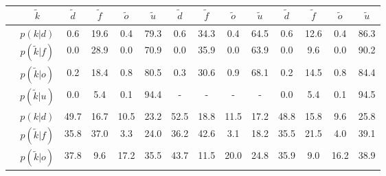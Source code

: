 \newpage
\begin{center}
	\footnotesize
	\begin{tabular}{c|c|cccc|cccc|cccc}
		&$\tilde{k}$ & $\tilde{d}$ & $\tilde{f}$ & $\tilde{o}$ & $\tilde{u}$ & $\tilde{d}$ & $\tilde{f}$ & $\tilde{o}$ & $\tilde{u}$ & $\tilde{d}$ & $\tilde{f}$ & $\tilde{o}$ & $\tilde{u}$\\
		\hline
		\parbox[t]{2mm}{}&$p(k|d)$ & \textcolor{mygreen}{0.6} & \textcolor{myred}{19.6} & \textcolor{myred}{0.4} & 79.3 & \textcolor{mygreen}{0.6} & \textcolor{myred}{34.3} & \textcolor{myred}{0.4} & 64.5 & \textcolor{mygreen}{0.6} & \textcolor{myred}{12.6} & \textcolor{myred}{0.4} & 86.3\\
		&$p(\tilde{k}|f)$ & \textcolor{myred}{0.0} & \textcolor{mygreen}{28.9} & \textcolor{myred}{0.0} & 70.9 & \textcolor{myred}{0.0} & \textcolor{mygreen}{35.9} & \textcolor{myred}{0.0} & 63.9 & \textcolor{myred}{0.0} & \textcolor{mygreen}{9.6} & \textcolor{myred}{0.0} & 90.2\\
		&$p(\tilde{k}|o)$ & \textcolor{myred}{0.2} & \textcolor{myred}{18.4} & \textcolor{mygreen}{0.8} & 80.5 & \textcolor{myred}{0.3} & \textcolor{myred}{30.6} & \textcolor{mygreen}{0.9} & 68.1 & \textcolor{myred}{0.2} & \textcolor{myred}{14.5} & \textcolor{mygreen}{0.8} & 84.4\\
		&$p(\tilde{k}|u)$ & 0.0 & 5.4 & 0.1 & 94.4 & - & - & - & - & 0.0 & 5.4 & 0.1 & 94.5\\
		\hline
		\parbox[t]{2mm}{}&$p(k|d)$ & \textcolor{mygreen}{49.7} & \textcolor{myred}{16.7} & \textcolor{myred}{10.5} & 23.2 & \textcolor{mygreen}{52.5} & \textcolor{myred}{18.8} & \textcolor{myred}{11.5} & 17.2 & \textcolor{mygreen}{48.8} & \textcolor{myred}{15.8} & \textcolor{myred}{9.6} & 25.8\\
		&$p(\tilde{k}|f)$ & \textcolor{myred}{35.8} & \textcolor{mygreen}{37.0} & \textcolor{myred}{3.3} & 24.0 & \textcolor{myred}{36.2} & \textcolor{mygreen}{42.6} & \textcolor{myred}{3.1} & 18.2 & \textcolor{myred}{35.5} & \textcolor{mygreen}{21.5} & \textcolor{myred}{4.0} & 39.1\\
		&$p(\tilde{k}|o)$ & \textcolor{myred}{37.8} & \textcolor{myred}{9.6} & \textcolor{mygreen}{17.2} & 35.5 & \textcolor{myred}{43.7} & \textcolor{myred}{11.5} & \textcolor{mygreen}{20.0} & 24.8 & \textcolor{myred}{35.9} & \textcolor{myred}{9.0} & \textcolor{mygreen}{16.2} & 38.9\\

\end{tabular}
\end{center}
